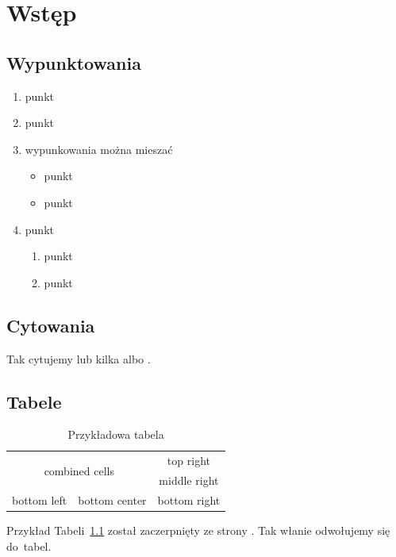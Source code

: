 \chapter[Przykładowy rozdział]{Wstęp} %

\section{Wypunktowania}
\begin{enumerate}
    \item punkt
    \item punkt
    \item wypunkowania można mieszać
\begin{itemize}
    \item punkt
    \item punkt
\end{itemize}
    \item punkt
\begin{enumerate}
    \item punkt
    \item punkt
\end{enumerate}
\end{enumerate}
\section{Cytowania}
Tak cytujemy \cite{NagraTC02} lub kilka \cite{NagraTC02,iso9126} albo \cite[str. 3]{NagraTC02}.
\section{Tabele}
\begin{table}[h]
\centering
\caption{Przykładowa tabela}
\begin{tabular}{|c|c|c|}\hline
\multicolumn{2}{|c|}{\multirow{2}{*}{combined cells}}
     &top right\\ \cline{3-3}
\multicolumn{2}{|c|}{}
     &middle right\\ \hline
bottom left
     &bottom center
     &bottom right\\ \hline
\end{tabular}
\label{tab:prz}
\end{table}
Przykład Tabeli~\ref{tab:prz} został zaczerpnięty ze strony \cite{przyklad}. Tak włanie odwołujemy się do~tabel.%

